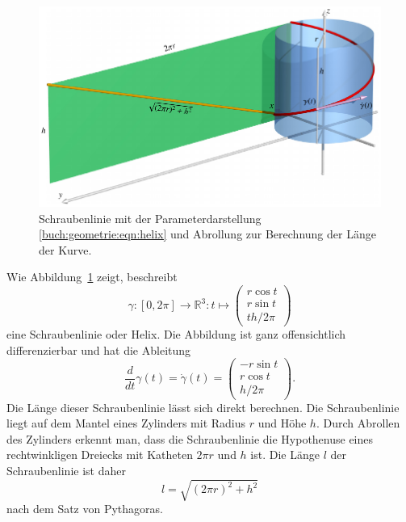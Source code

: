 \begin{beispiel}
\begin{figure}
\centering
\includegraphics[width=\textwidth]{chapters/030-geometrie/images/zylinder.pdf}
\caption{Schraubenlinie mit der Parameterdarstellung
\eqref{buch:geometrie:eqn:helix} und Abrollung zur Berechnung der
Länge der Kurve.
\label{buch:geometrie:fig:zylinder}}
\end{figure}
Wie Abbildung~\ref{buch:geometrie:fig:zylinder} zeigt, beschreibt
\begin{equation}
\gamma
\colon
[0,2\pi] \to \mathbb{R}^3
:
t\mapsto\begin{pmatrix}r\cos t\\ r\sin t\\ th/2\pi\end{pmatrix}
\label{buch:geometrie:eqn:helix}
\end{equation}
eine Schraubenlinie oder Helix.
%
%
Die Abbildung ist ganz offensichtlich differenzierbar und hat die
Ableitung
\begin{equation}
\frac{d}{dt}\gamma(t)
=
\dot{\gamma}(t)
=
\begin{pmatrix} -r\sin t \\ r\cos t \\ h/2\pi\end{pmatrix}.
\label{buch:geometrie:eqn:helixdot}
\end{equation}
Die Länge dieser Schraubenlinie lässt sich direkt berechnen.
Die Schraubenlinie liegt auf dem Mantel eines Zylinders mit
Radius $r$ und Höhe $h$.
Durch Abrollen des Zylinders erkennt man, dass die Schraubenlinie
die Hypothenuse eines rechtwinkligen Dreiecks mit Katheten 
$2\pi r$ und $h$ ist.
Die Länge $l$ der Schraubenlinie ist daher
\begin{equation}
l = \sqrt{(2\pi r)^2 +h^2}
\label{buch:geometrie:eqn:helixlaenge}
\end{equation}
nach dem Satz von Pythagoras.
\end{beispiel}

